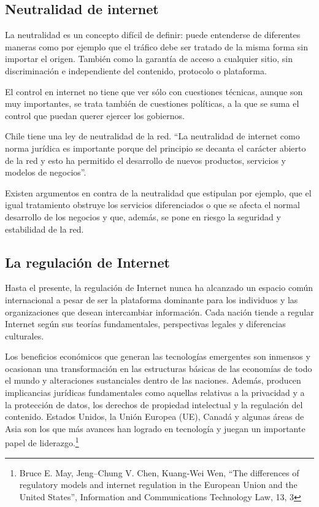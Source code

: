 \documentclass[12pt]{report} %
\begin{document}


\subsection{Neutralidad de internet}

La neutralidad es un concepto difícil de definir: puede entenderse de diferentes maneras como por ejemplo que el tráfico debe ser tratado de la misma forma sin importar el origen. También como la garantía de acceso a cualquier sitio, sin discriminación e independiente del contenido, protocolo o plataforma.

El control en internet no tiene que ver sólo con cuestiones técnicas, aunque son muy importantes, se trata también de cuestiones políticas, a la que se suma el control que puedan querer ejercer los gobiernos.

Chile tiene una ley de neutralidad de la red. “La neutralidad de internet como norma jurídica es importante porque del principio se decanta el carácter abierto de la red y esto ha permitido el desarrollo de nuevos productos, servicios y modelos de negocios”. 

Existen argumentos en contra de la neutralidad que estipulan por ejemplo,  que el igual tratamiento obstruye los servicios diferenciados o que se afecta el normal desarrollo de los negocios y que, además, se pone en riesgo la seguridad y estabilidad de la red. 

\subsection{La regulación de Internet}

Hasta el presente, la regulación de Internet nunca ha alcanzado un espacio común internacional a pesar de ser la plataforma dominante para los individuos y las organizaciones que desean intercambiar información. Cada nación tiende a regular Internet según sus teorías fundamentales, perspectivas legales y diferencias culturales. 

Los beneficios económicos que generan las tecnologías emergentes son inmensos y ocasionan una transformación en las estructuras básicas de las economías de todo el mundo y alteraciones sustanciales dentro de las naciones. Además, producen implicancias jurídicas fundamentales como aquellas relativas a la privacidad y a la protección de datos, los derechos de propiedad intelectual y la regulación del contenido.
Estados Unidos, la Unión Europea (UE), Canadá y algunas áreas de Asia son los que más avances han logrado en tecnología y juegan un importante papel de liderazgo.\footnote{Bruce E. May, Jeng--Chung V. Chen, Kuang‐Wei Wen, “The differences of regulatory models and internet regulation in the European Union and the United States”, Information and Communications Technology Law, 13, 3}  
\end{document}

